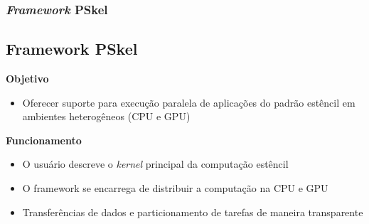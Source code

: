\documentclass[xcolor={table}]{beamer}
\begin{document}

\begin{frame}\frametitle{\textit{Framework} PSkel}
    \subsection{Framework PSkel}

    \textbf{Objetivo}
    \begin{itemize}
        \item{Oferecer suporte para execução paralela de aplicações do padrão estêncil em ambientes heterogêneos (CPU e GPU)~\cite{pereira15}}
    \end{itemize}

    \vspace{0.5cm}

    \textbf{Funcionamento}
    \begin{itemize}
        \item {O usuário descreve o \textit{kernel} principal da computação estêncil}
        \item {O framework se encarrega de distribuir a computação na CPU e GPU}
        \item {Transferências de dados e particionamento de tarefas de maneira transparente}
    \end{itemize}
\end{frame}
\end{document}
